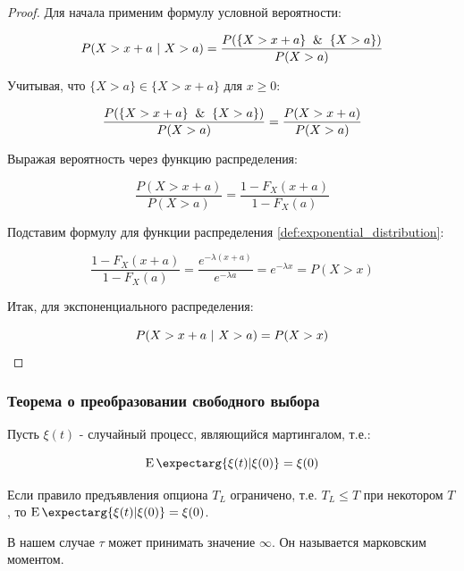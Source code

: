 \documentclass[a4paper,12pt]{article}
\theoremstyle{definition}
\newcommand{\expect}{\operatorname{E}\expectarg}
\begin{document}
\begin{proof}
Для начала применим формулу условной вероятности:

\begin{equation*}
    P (X > x + a\textup{ | }X > a) = \frac{P (\{X > x + a\}\And\{X > a\})}{P(X > a)}
\end{equation*}

Учитывая, что $\{X > a\} \in \{X > x + a\}$ для $x \ge 0$:

\begin{equation*}
    \frac{P (\{X > x + a\}\And\{X > a\})}{P(X > a)} = \frac{P(X > x + a)}{P(X > a)}
\end{equation*}

Выражая вероятность через функцию распределения:

\begin{equation*}
    \frac{P(X > x + a)}{P(X > a)} = \frac{1 - F_X(x + a)}{1 - F_X(a)}
\end{equation*}

Подставим формулу для функции распределения \eqref{def:exponential_distribution}:

\begin{equation*}
    \frac{1 - F_X(x + a)}{1 - F_X(a)} = \frac{e^{-\lambda (x + a)}}{e^{-\lambda a}} = e^{-\lambda x} = P(X > x)
\end{equation*}

Итак, для экспоненциального распределения:

\begin{equation*}
    P (X > x + a\textup{ | }X > a) = P(X > x)
\end{equation*}

\end{proof}

\subsubsection{Теорема о преобразовании свободного выбора}

Пусть $\xi (t)$ - случайный процесс, являющийся мартингалом, т.е.:

\begin{equation*}
    \expect{\xi (t)|\xi(0)} = \xi(0)
\end{equation*}

Если правило предъявления опциона $T_L$ ограничено, т.е. $T_L \le T$ при некотором $T$, то $\expect{\xi (t)|\xi(0)} = \xi(0)$.

В нашем случае $\tau$ может принимать значение $\infty$. Он называется марковским моментом.
\end{document}
